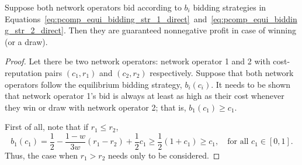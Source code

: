 \begin{propositiona}[\ref{prop:pcomp_negative_bids_direct}]
Suppose both network operators bid according to $b_i$ bidding strategies in Equations~\eqref{eq:pcomp_equi_bidding_str_1_direct}~and~\eqref{eq:pcomp_equi_bidding_str_2_direct}. Then they are guaranteed nonnegative profit in case of winning (or a draw).
\end{propositiona}
\begin{proof}
Let there be two network operators: network operator 1 and 2 with cost-reputation pairs $(c_1,r_1)$ and $(c_2,r_2)$ respectively. Suppose that both network operators follow the equilibrium bidding strategy, $b_i(c_i)$. It needs to be shown that network operator 1's bid is always at least as high as their cost whenever they win or draw with network operator 2; that is, $b_1(c_1)\ge c_1$.

First of all, note that if $r_1\le r_2$,
\begin{equation}
	b_1(c_1) = \frac{1}{2}-\frac{1-w}{3w}(r_1-r_2) + \frac{1}{2}c_1 \ge \frac{1}{2}(1+c_1) \ge c_1, \quad\text{for all } c_1\in[0,1].
\end{equation}
Thus, the case when $r_1>r_2$ needs only to be considered.


\end{proof}
